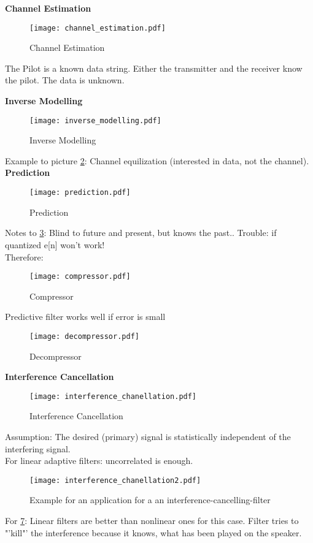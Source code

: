\textbf{Channel Estimation}
	\begin{figure}[H]
	\centering
	\texttt{[image: channel\_estimation.pdf]}
	\caption{Channel Estimation}
	\label{channel_estimation} 
\end{figure}
The Pilot is a known data string. Either the transmitter and the receiver know the pilot. The data is unknown.

\textbf{Inverse Modelling}
	\begin{figure}[H]
	\centering
	\texttt{[image: inverse\_modelling.pdf]}
	\caption{Inverse Modelling}
	\label{inversemodelling} 
\end{figure}
Example to picture \ref{inversemodelling}: Channel equilization (interested in data, not the channel).\\
\textbf{Prediction}
	\begin{figure}[H]
	\centering
	\texttt{[image: prediction.pdf]}
	\caption{Prediction}
	\label{prediction} 
\end{figure}
Notes to \ref{prediction}: Blind to future and present, but knows the past.. Trouble: if quantized e[n] won't work!\\
Therefore:\\
	\begin{figure}[H]
	\centering
	\texttt{[image: compressor.pdf]}
	\caption{Compressor}
	\label{compressor} 
\end{figure}
Predictive filter works well \pfeil if error is small\\
	\begin{figure}[H]
	\centering
	\texttt{[image: decompressor.pdf]}
	\caption{Decompressor}
	\label{decompressor} 
\end{figure}

\textbf{Interference Cancellation}
	\begin{figure}[H]
	\centering
	\texttt{[image: interference\_chanellation.pdf]}
	\caption{Interference Cancellation}
	\label{interference1} 
\end{figure}
Assumption: The desired (primary) signal is statistically independent of the interfering signal.\\
For linear adaptive filters: uncorrelated is enough. 
\begin{figure}[H]
	\centering
	\texttt{[image: interference\_chanellation2.pdf]}
	\caption{Example for an application for a an interference-cancelling-filter}
	\label{interference2} 
\end{figure}
For \ref{interference2}: Linear filters are better than nonlinear ones for this case. Filter tries to "'kill"' the interference because it knows, what has been played on the speaker.

